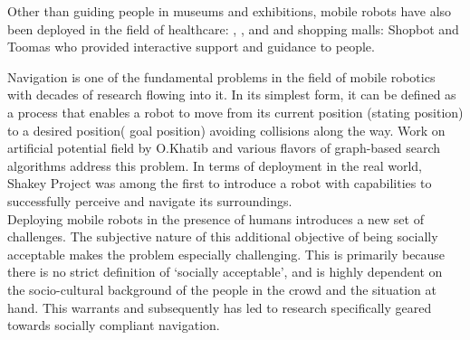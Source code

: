 Other than guiding people in museums and exhibitions, mobile robots have also been deployed in the field of healthcare: \cite{pearl_pollack_2002}, \cite{kim_socially_2016}, and \cite{kuderer_feature-based_nodate} and shopping malls: Shopbot \cite{shopbot_kanada} and Toomas \cite{toomas_gross_2009} who provided interactive support and guidance to people.   



Navigation is one of the fundamental problems in the field of mobile robotics with decades of research flowing into it. In its simplest form, it can be defined as a process that enables a robot to move from its current position (stating position) to a desired position( goal position) avoiding collisions along the way. Work on artificial potential field by O.Khatib \cite{khatib_1986} and various flavors of graph-based search algorithms address this problem. In terms of deployment in the real world, Shakey Project \cite{project-shakey} was among the first to introduce a robot with capabilities to successfully perceive and navigate its surroundings.\\

Deploying mobile robots in the presence of humans introduces a new set of challenges.  The subjective nature of this additional objective of being socially acceptable makes the problem especially challenging. This is primarily because there is no strict definition of `socially acceptable', and is highly dependent on the socio-cultural background of the people in the crowd and the situation at hand. This warrants and subsequently has led to research specifically geared towards socially compliant navigation.\\

